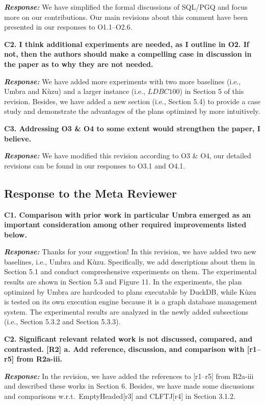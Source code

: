 \textbf{\textit{Response: }}
We have simplified the formal discussions of SQL/PGQ and focus more on our contributions.
Our main revisions about this comment have been presented in our responses to O1.1--O2.6.


\textbf{
C2. I think additional experiments are needed, as I outline in O2. If not, then the authors should make a compelling case in discussion in the paper as to why they are not needed.}

\textbf{\textit{Response: }}
We have added more experiments with two more baselines (i.e., Umbra and K\`uzu) and a larger instance (i.e., $LDBC100$) in Section 5 of this revision.
Besides, we have added a new section (i.e., Section 5.4) to provide a case study and  demonstrate the advantages of the plans optimized by \name more intuitively.


\textbf{
C3. Addressing O3 \& O4 to some extent would strengthen the paper, I believe.}

\textbf{\textit{Response: }}
We have modified this revision according to O3 \& O4, our detailed revisions can be found in our responses to O3.1 and O4.1.



\subsection{Response to the Meta Reviewer}

\textbf{
C1. Comparison with prior work in particular Umbra emerged as an important consideration among other required improvements listed below.}

\textbf{\textit{Response: }}
Thanks for your suggestion! 
In this revision, we have added two new baselines, i.e., Umbra and K\`uzu.
Specifically, we add descriptions about them in Section 5.1 and conduct compreshensive experiments on them.
The experimental results are shown in Section 5.3 and Figure 11.
In the experiments, the plan optimized by Umbra are hardcoded to plans executable by DuckDB, while K\`uzu is tested on its own execution engine because it is a graph database management system.
The experimental results are analyzed in the newly added subsections (i.e., Section 5.3.2 and Section 5.3.3).



\textbf{
C2. Significant relevant related work is not discussed, compared, and contrasted. [R2]
a. Add reference, discussion, and comparison with [r1–r5] from R2a-iii.
}

\textbf{\textit{Response: }}
In the revision, we have added the references to [r1--r5] from R2a-iii and described these works in Section 6.
Besides, we have made some discussions and comparisons w.r.t.~EmptyHeaded[r3] and CLFTJ[r4] in Section 3.1.2.


